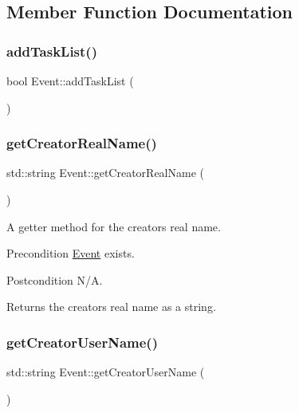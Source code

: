 \subsection{Member Function Documentation}
\mbox{\label{class_event_aea4ec6f1a93920ffc1dd5b15a4ab0e19}} 
\subsubsection{\texorpdfstring{add\+Task\+List()}{addTaskList()}}
{\footnotesize\ttfamily bool Event\+::add\+Task\+List (\begin{DoxyParamCaption}{ }\end{DoxyParamCaption})}

\mbox{\label{class_event_a06b528ce79f5b78eeee98b6fd428522d}} 
\subsubsection{\texorpdfstring{get\+Creator\+Real\+Name()}{getCreatorRealName()}}
{\footnotesize\ttfamily std\+::string Event\+::get\+Creator\+Real\+Name (\begin{DoxyParamCaption}{ }\end{DoxyParamCaption})}

A getter method for the creator\textquotesingle{}s real name. \begin{DoxyPrecond}{Precondition}
\mbox{\hyperlink{class_event}{Event}} exists. 
\end{DoxyPrecond}
\begin{DoxyPostcond}{Postcondition}
N/A. 
\end{DoxyPostcond}
\begin{DoxyReturn}{Returns}
the creator\textquotesingle{}s real name as a string. 
\end{DoxyReturn}
\mbox{\label{class_event_a89a5b51bde088fb8b85732655f593046}} 
\subsubsection{\texorpdfstring{get\+Creator\+User\+Name()}{getCreatorUserName()}}
{\footnotesize\ttfamily std\+::string Event\+::get\+Creator\+User\+Name (\begin{DoxyParamCaption}{ }\end{DoxyParamCaption})}


